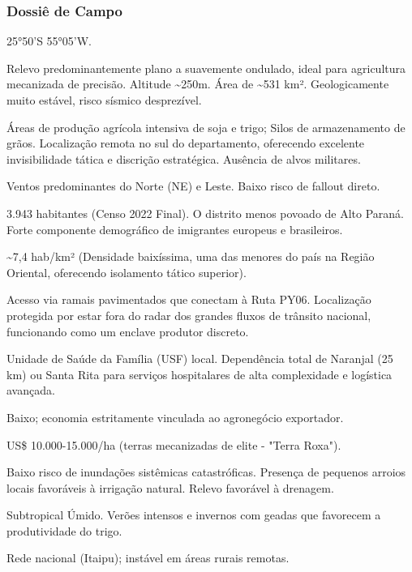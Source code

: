 \subsubsection{Dossiê de Campo}
\begin{description}[style=nextline,leftmargin=0.5cm,font=\bfseries]
\item[Coordenadas]  25°50'S 55°05'W.
\item[Topografia]  Relevo predominantemente plano a suavemente ondulado, ideal para agricultura mecanizada de precisão. Altitude \textasciitilde 250m. Área de \textasciitilde 531 km². Geologicamente muito estável, risco sísmico desprezível.
\item[Alvos Estratégicos]  Áreas de produção agrícola intensiva de soja e trigo; Silos de armazenamento de grãos. Localização remota no sul do departamento, oferecendo excelente invisibilidade tática e discrição estratégica. Ausência de alvos militares.
\item[Fallout]  Ventos predominantes do Norte (NE) e Leste. Baixo risco de fallout direto.
\item[População]  3.943 habitantes (Censo 2022 Final). O distrito menos povoado de Alto Paraná. Forte componente demográfico de imigrantes europeus e brasileiros.
\item[Densidade]  \textasciitilde 7,4 hab/\allowbreak km² (Densidade baixíssima, uma das menores do país na Região Oriental, oferecendo isolamento tático superior).
\item[Vias de Acesso]  Acesso via ramais pavimentados que conectam à Ruta PY06. Localização protegida por estar fora do radar dos grandes fluxos de trânsito nacional, funcionando como um enclave produtor discreto.
\item[Serviços]  Unidade de Saúde da Família (USF) local. Dependência total de Naranjal (25 km) ou Santa Rita para serviços hospitalares de alta complexidade e logística avançada.
\item[Custo de Vida]  Baixo; economia estritamente vinculada ao agronegócio exportador.
\item[Preço da Terra]  US\$ 10.000-15.000/\allowbreak ha (terras mecanizadas de elite - "Terra Roxa").
\item[Hidrologia]  Baixo risco de inundações sistêmicas catastróficas. Presença de pequenos arroios locais favoráveis à irrigação natural. Relevo favorável à drenagem.
\item[Clima]  Subtropical Úmido. Verões intensos e invernos com geadas que favorecem a produtividade do trigo.
\item[Energia]  Rede nacional (Itaipu); instável em áreas rurais remotas.

\end{description}

